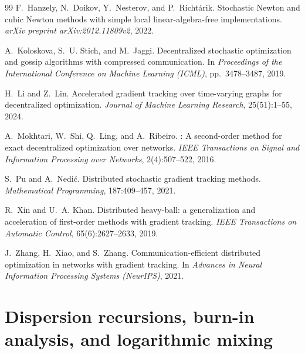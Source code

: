 \documentclass[11pt,a4paper]{article}
\begin{document}
\begin{thebibliography}{99}
		F.~Hanzely, N.~Doikov, Y.~Nesterov, and P.~Richt{\'a}rik.
		\newblock Stochastic Newton and cubic Newton methods with simple local linear-algebra-free implementations.
		\newblock \emph{arXiv preprint arXiv:2012.11809v2}, 2022.
		
		A.~Koloskova, S.~U. Stich, and M.~Jaggi.
		\newblock Decentralized stochastic optimization and gossip algorithms with compressed communication.
		\newblock In \emph{Proceedings of the International Conference on Machine Learning (ICML)}, pp.~3478--3487, 2019.
		
		H.~Li and Z.~Lin.
		\newblock Accelerated gradient tracking over time-varying graphs for decentralized optimization.
		\newblock \emph{Journal of Machine Learning Research}, 25(51):1--55, 2024.
		
		A.~Mokhtari, W.~Shi, Q.~Ling, and A.~Ribeiro.
		: A second-order method for exact decentralized optimization over networks.
		\newblock \emph{IEEE Transactions on Signal and Information Processing over Networks}, 2(4):507--522, 2016.
		
		S.~Pu and A.~Nedi{\'c}.
		\newblock Distributed stochastic gradient tracking methods.
		\newblock \emph{Mathematical Programming}, 187:409--457, 2021.
		
		R.~Xin and U.~A. Khan.
		\newblock Distributed heavy-ball: a generalization and acceleration of first-order methods with gradient tracking.
		\newblock \emph{IEEE Transactions on Automatic Control}, 65(6):2627--2633, 2019.
		
		J.~Zhang, H.~Xiao, and S.~Zhang.
		\newblock Communication-efficient distributed optimization in networks with gradient tracking.
		\newblock In \emph{Advances in Neural Information Processing Systems (NeurIPS)}, 2021.
		
	\end{thebibliography}

\appendix

\section{Dispersion recursions, burn-in analysis, and logarithmic mixing}\label{app:dispersion}
\end{document}
